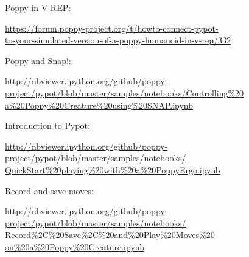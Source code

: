 \documentclass{article}
\begin{document}
Poppy in V-REP:

\begin{flushright}
 \href{https://forum.poppy-project.org/t/howto-connect-pypot-to-your-simulated-version-of-a-poppy-humanoid-in-v-rep/332}{https://forum.poppy-project.org/t/howto-connect-pypot-\\to-your-simulated-version-of-a-poppy-humanoid-in-v-rep/332}
 \end{flushright}

Poppy and Snap!:

\begin{flushright}
\href{http://nbviewer.ipython.org/github/poppy-project/pypot/blob/master/samples/notebooks/Controlling%20a%20Poppy%20Creature%20using%20SNAP.ipynb}{http://nbviewer.ipython.org/github/poppy-project/pypot/blob/master/samples/notebooks/Controlling\%20\\a\%20Poppy\%20Creature\%20using\%20SNAP.ipynb}

\end{flushright}

Introduction to Pypot:
\begin{flushright}
\href{http://nbviewer.ipython.org/github/poppy-project/pypot/blob/master/samples/notebooks/QuickStart%20playing%20with%20a%20PoppyErgo.ipynb}{http://nbviewer.ipython.org/github/poppy-project/pypot/blob/master/samples/notebooks/\\QuickStart\%20playing\%20with\%20a\%20PoppyErgo.ipynb} 
\end{flushright}

Record and save moves:
\begin{flushright}
\href{http://nbviewer.ipython.org/github/poppy-project/pypot/blob/master/samples/notebooks/Record%2C%20Save%2C%20and%20Play%20Moves%20on%20a%20Poppy%20Creature.ipynb}{http://nbviewer.ipython.org/github/poppy-project/pypot/blob/master/samples/notebooks/\\Record\%2C\%20Save\%2C\%20and\%20Play\%20Moves\%20\\on\%20a\%20Poppy\%20Creature.ipynb} 
\end{flushright}
\end{document}

